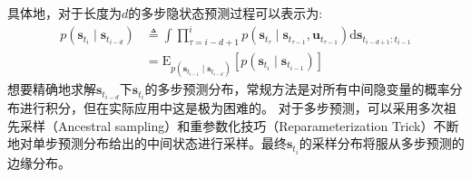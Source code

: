具体地，对于长度为$d$的多步隐状态预测过程可以表示为:
\begin{equation}
\begin{aligned}
p\left(\boldsymbol{s}_{t_i} \mid \boldsymbol{s}_{t_{i-d}}\right) & \triangleq \int \prod_{\tau=i-d+1}^{i} p\left(\boldsymbol{s}_{t_\tau} \mid \boldsymbol{s}_{t_{\tau-1}},\boldsymbol{u}_{t_{\tau-1}}\right) \mathrm{d} \boldsymbol{s}_{t_{i-d+1}: t_{i-1}} \\
&=\mathrm{E}_{p\left(\boldsymbol{s}_{t_{i-1}} \mid \boldsymbol{s}_{t_{i-d}}\right)}\left[p\left(\boldsymbol{s}_{t_i} \mid \boldsymbol{s}_{t_{i-1}}\right)\right]
\end{aligned}
\label{equ:multistep}
\end{equation}
想要精确地求解$\boldsymbol{s}_{t_{i-d}} $下$\boldsymbol{s}_{t_{i}}$的多步预测分布，常规方法是对所有中间隐变量的概率分布进行积分，但在实际应用中这是极为困难的。
对于多步预测，可以采用多次祖先采样（Ancestral sampling）和重参数化技巧（Reparameterization Trick）不断地对单步预测分布给出的中间状态进行采样。最终$\boldsymbol{s}_{t_{i}}$的采样分布将服从多步预测的边缘分布。

